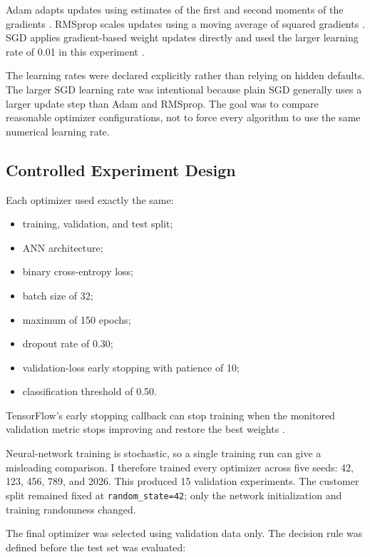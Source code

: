 \documentclass[11pt]{article}
\begin{document}
Adam adapts updates using estimates of the first and second moments of the gradients \citep{kingma2015,tfAdam}. RMSprop scales updates using a moving average of squared gradients \citep{tfRMSprop}. SGD applies gradient-based weight updates directly and used the larger learning rate of 0.01 in this experiment \citep{tfSGD}.

The learning rates were declared explicitly rather than relying on hidden defaults. The larger SGD learning rate was intentional because plain SGD generally uses a larger update step than Adam and RMSprop. The goal was to compare reasonable optimizer configurations, not to force every algorithm to use the same numerical learning rate.

\subsection{Controlled Experiment Design}

Each optimizer used exactly the same:

\begin{itemize}[leftmargin=*]
    \item training, validation, and test split;
    \item ANN architecture;
    \item binary cross-entropy loss;
    \item batch size of 32;
    \item maximum of 150 epochs;
    \item dropout rate of 0.30;
    \item validation-loss early stopping with patience of 10;
    \item classification threshold of 0.50.
\end{itemize}

TensorFlow's early stopping callback can stop training when the monitored validation metric stops improving and restore the best weights \citep{tfEarlyStopping}.

Neural-network training is stochastic, so a single training run can give a misleading comparison. I therefore trained every optimizer across five seeds: 42, 123, 456, 789, and 2026. This produced 15 validation experiments. The customer split remained fixed at \texttt{random\_state=42}; only the network initialization and training randomness changed.

The final optimizer was selected using validation data only. The decision rule was defined before the test set was evaluated:
\end{document}
